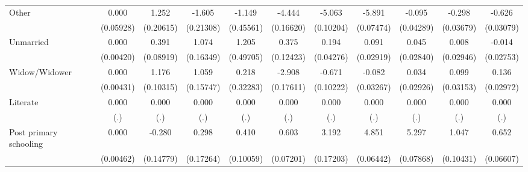 {\begin{tabular}{l*{10}{c}}
Other               &       0.000         &       1.252\sym{***}&      -1.605\sym{***}&      -1.149\sym{*}  &      -4.444\sym{***}&      -5.063\sym{***}&      -5.891\sym{***}&      -0.095\sym{*}  &      -0.298\sym{***}&      -0.626\sym{***}\\
                    &   (0.05928)         &   (0.20615)         &   (0.21308)         &   (0.45561)         &   (0.16620)         &   (0.10204)         &   (0.07474)         &   (0.04289)         &   (0.03679)         &   (0.03079)         \\
Unmarried           &       0.000         &       0.391\sym{***}&       1.074\sym{***}&       1.205\sym{*}  &       0.375\sym{**} &       0.194\sym{***}&       0.091\sym{**} &       0.045         &       0.008         &      -0.014         \\
                    &   (0.00420)         &   (0.08919)         &   (0.16349)         &   (0.49705)         &   (0.12423)         &   (0.04276)         &   (0.02919)         &   (0.02840)         &   (0.02946)         &   (0.02753)         \\
Widow/Widower       &       0.000         &       1.176\sym{***}&       1.059\sym{***}&       0.218         &      -2.908\sym{***}&      -0.671\sym{***}&      -0.082\sym{*}  &       0.034         &       0.099\sym{**} &       0.136\sym{***}\\
                    &   (0.00431)         &   (0.10315)         &   (0.15747)         &   (0.32283)         &   (0.17611)         &   (0.10222)         &   (0.03267)         &   (0.02926)         &   (0.03153)         &   (0.02972)         \\
Literate            &       0.000         &       0.000         &       0.000         &       0.000         &       0.000         &       0.000         &       0.000         &       0.000         &       0.000         &       0.000         \\
                    &         (.)         &         (.)         &         (.)         &         (.)         &         (.)         &         (.)         &         (.)         &         (.)         &         (.)         &         (.)         \\
Post primary schooling&       0.000         &      -0.280         &       0.298         &       0.410\sym{***}&       0.603\sym{***}&       3.192\sym{***}&       4.851\sym{***}&       5.297\sym{***}&       1.047\sym{***}&       0.652\sym{***}\\
                    &   (0.00462)         &   (0.14779)         &   (0.17264)         &   (0.10059)         &   (0.07201)         &   (0.17203)         &   (0.06442)         &   (0.07868)         &   (0.10431)         &   (0.06607)         \\

\end{tabular}}
